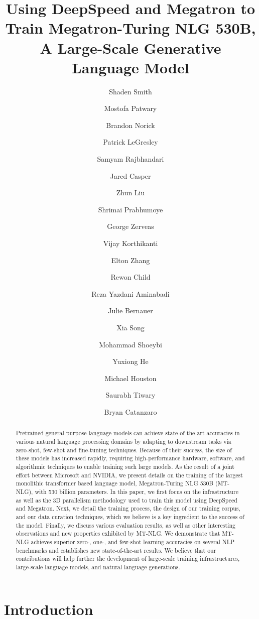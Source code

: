 \documentclass[11pt]{article}
\title{Using DeepSpeed and Megatron to Train Megatron-Turing NLG 530B, A Large-Scale Generative Language Model}
\author[*,$\dag$]{Shaden Smith}
\author[*,$\ddag$]{Mostofa Patwary}
\author[$\dag$]{Brandon Norick}
\author[$\ddag$]{Patrick LeGresley}
\author[$\dag$]{Samyam Rajbhandari}
\author[$\ddag$]{Jared Casper}
\author[$\dag$]{Zhun Liu}
\author[$\ddag$]{Shrimai Prabhumoye}
\author[$\dag$]{George Zerveas}
\author[$\ddag$]{Vijay Korthikanti}
\author[$\dag$]{Elton Zhang}
\author[$\ddag$]{Rewon Child}
\author[$\dag$]{Reza Yazdani Aminabadi}
\author[$\ddag$]{Julie Bernauer}
\author[$\dag$]{Xia Song}
\author[$\ddag$]{Mohammad Shoeybi}
\author[$\dag$]{Yuxiong He}
\author[$\ddag$]{Michael Houston}
\author[$\dag$]{Saurabh Tiwary}
\author[$\ddag$]{Bryan Catanzaro}
\affil[*]{equal contribution}
\affil[$\dag$]{Microsoft}
\affil[$\ddag$]{NVIDIA}
\date{}
\newcommand{\Mo}[1]{{\color{blue}{\textbf{Mohammad}: #1}}}
\newcommand{\GEO}[1]{{\color{violet}{\textbf{George}: #1}}}
\newcommand{\ours}{MT-NLG}
\begin{document}
\parindent 0.0in
\parskip 0.15in

\maketitle

\begin{abstract}

Pretrained general-purpose language models can achieve state-of-the-art accuracies in various natural language processing domains by adapting to downstream tasks via zero-shot, few-shot and fine-tuning techniques. Because of their success, the size of these models has increased rapidly, requiring high-performance hardware, software, and algorithmic techniques to enable training such large models. As the result of a joint effort between Microsoft and NVIDIA, we present details on the training of the largest monolithic transformer based language model, Megatron-Turing NLG 530B ({\ours}), with 530 billion parameters. In this paper, we first focus on the infrastructure as well as the 3D parallelism methodology used to train this model using DeepSpeed and Megatron. Next, we detail the training process, the design of our training corpus, and our data curation techniques, which we believe is a key ingredient to the success of the model. Finally, we discuss various evaluation results, as well as other interesting observations and new properties exhibited by {\ours}. We demonstrate that {\ours} achieves superior zero-, one-, and  few-shot learning  accuracies on  several  NLP  benchmarks and establishes new state-of-the-art results. We believe that our contributions will help further the development of large-scale training infrastructures, large-scale language models, and natural language generations.
\end{abstract}

\section{Introduction}
\end{document}
